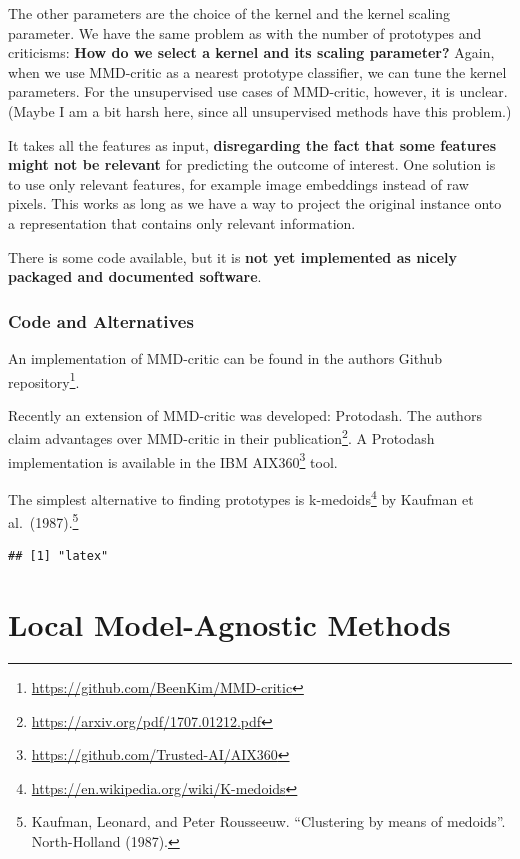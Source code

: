 \documentclass[
  11pt,
]{scrbook}
\renewcommand{\href}[2]{#2\footnote{\url{#1}}}
\begin{document}
The other parameters are the choice of the kernel and the kernel scaling parameter.
We have the same problem as with the number of prototypes and criticisms:
\textbf{How do we select a kernel and its scaling parameter?}
Again, when we use MMD-critic as a nearest prototype classifier, we can tune the kernel parameters.
For the unsupervised use cases of MMD-critic, however, it is unclear.
(Maybe I am a bit harsh here, since all unsupervised methods have this problem.)

It takes all the features as input, \textbf{disregarding the fact that some features might not be relevant} for predicting the outcome of interest.
One solution is to use only relevant features, for example image embeddings instead of raw pixels.
This works as long as we have a way to project the original instance onto a representation that contains only relevant information.

There is some code available, but it is \textbf{not yet implemented as nicely packaged and documented software}.

\hypertarget{code-and-alternatives}{%
\subsection{Code and Alternatives}\label{code-and-alternatives}}

An implementation of MMD-critic can be found in \href{https://github.com/BeenKim/MMD-critic}{the authors Github repository}.

Recently an extension of MMD-critic was developed: Protodash.
The authors claim advantages over MMD-critic in their \href{https://arxiv.org/pdf/1707.01212.pdf}{publication}.
A Protodash implementation is available in the \href{https://github.com/Trusted-AI/AIX360}{IBM AIX360} tool.

The simplest alternative to finding prototypes is \href{https://en.wikipedia.org/wiki/K-medoids}{k-medoids} by Kaufman et al.~(1987).\footnote{Kaufman, Leonard, and Peter Rousseeuw. ``Clustering by means of medoids''. North-Holland (1987).}

\begin{verbatim}
## [1] "latex"
\end{verbatim}

\hypertarget{local-methods}{%
\chapter{Local Model-Agnostic Methods}\label{local-methods}}
\end{document}
